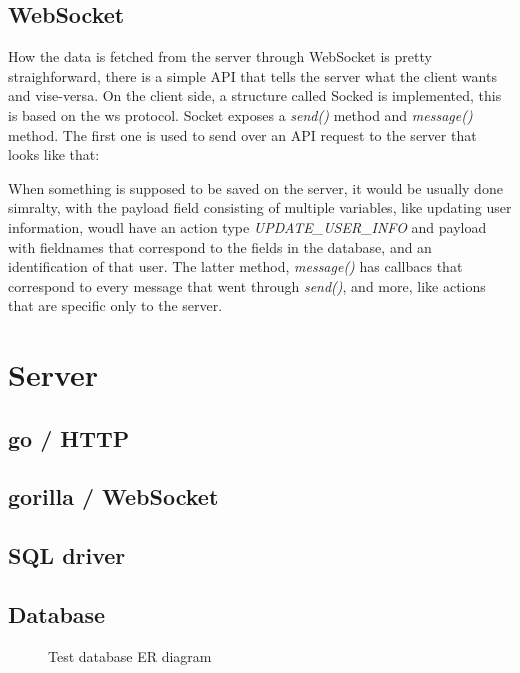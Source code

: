 \subsection{WebSocket}
How the data is fetched from the server through WebSocket is pretty straighforward, there is a simple API that tells the server what the client wants and vise-versa. On the client side, a structure called Socked is implemented, this is based on the ws protocol. Socket exposes a \emph{send()} method and \emph{message()} method. The first one is used to send over an API request to the server that looks like that:

When something is supposed to be saved on the server, it would be usually done simralty, with the payload field consisting of multiple variables, like updating user information, woudl have an action type \emph{UPDATE\_USER\_INFO} and payload with fieldnames that correspond to the fields in the database, and an identification of that user. The latter method, \emph{message()} has callbacs that correspond to every message that went through \emph{send()}, and more, like actions that are specific only to the server.


\section{Server}
\subsection{go / HTTP}
\subsection{gorilla / WebSocket}
\subsection{SQL driver}
\subsection{Database}

\begin{figure}[h]
  \centering
  \caption{Test database ER diagram}
  \label{fig:groupmanagement}
\end{figure}
